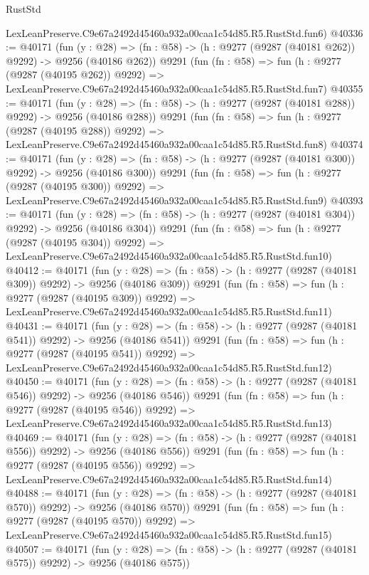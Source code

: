 \begin{lexlean}{RustStd}
\begin{coremodule}
    LexLeanPreserve.C9e67a2492d45460a932a00caa1c54d85.R5.RustStd.fun6)
@40336 := @40171
    (fun (y : @28) => (fn : @58) -> (h : @9277 (@9287 (@40181 @262)) @9292) -> @9256 (@40186 @262))
    @9291
    (fun (fn : @58) =>
    fun (h : @9277 (@9287 (@40195 @262)) @9292) =>
    LexLeanPreserve.C9e67a2492d45460a932a00caa1c54d85.R5.RustStd.fun7)
@40355 := @40171
    (fun (y : @28) => (fn : @58) -> (h : @9277 (@9287 (@40181 @288)) @9292) -> @9256 (@40186 @288))
    @9291
    (fun (fn : @58) =>
    fun (h : @9277 (@9287 (@40195 @288)) @9292) =>
    LexLeanPreserve.C9e67a2492d45460a932a00caa1c54d85.R5.RustStd.fun8)
@40374 := @40171
    (fun (y : @28) => (fn : @58) -> (h : @9277 (@9287 (@40181 @300)) @9292) -> @9256 (@40186 @300))
    @9291
    (fun (fn : @58) =>
    fun (h : @9277 (@9287 (@40195 @300)) @9292) =>
    LexLeanPreserve.C9e67a2492d45460a932a00caa1c54d85.R5.RustStd.fun9)
@40393 := @40171
    (fun (y : @28) => (fn : @58) -> (h : @9277 (@9287 (@40181 @304)) @9292) -> @9256 (@40186 @304))
    @9291
    (fun (fn : @58) =>
    fun (h : @9277 (@9287 (@40195 @304)) @9292) =>
    LexLeanPreserve.C9e67a2492d45460a932a00caa1c54d85.R5.RustStd.fun10)
@40412 := @40171
    (fun (y : @28) => (fn : @58) -> (h : @9277 (@9287 (@40181 @309)) @9292) -> @9256 (@40186 @309))
    @9291
    (fun (fn : @58) =>
    fun (h : @9277 (@9287 (@40195 @309)) @9292) =>
    LexLeanPreserve.C9e67a2492d45460a932a00caa1c54d85.R5.RustStd.fun11)
@40431 := @40171
    (fun (y : @28) => (fn : @58) -> (h : @9277 (@9287 (@40181 @541)) @9292) -> @9256 (@40186 @541))
    @9291
    (fun (fn : @58) =>
    fun (h : @9277 (@9287 (@40195 @541)) @9292) =>
    LexLeanPreserve.C9e67a2492d45460a932a00caa1c54d85.R5.RustStd.fun12)
@40450 := @40171
    (fun (y : @28) => (fn : @58) -> (h : @9277 (@9287 (@40181 @546)) @9292) -> @9256 (@40186 @546))
    @9291
    (fun (fn : @58) =>
    fun (h : @9277 (@9287 (@40195 @546)) @9292) =>
    LexLeanPreserve.C9e67a2492d45460a932a00caa1c54d85.R5.RustStd.fun13)
@40469 := @40171
    (fun (y : @28) => (fn : @58) -> (h : @9277 (@9287 (@40181 @556)) @9292) -> @9256 (@40186 @556))
    @9291
    (fun (fn : @58) =>
    fun (h : @9277 (@9287 (@40195 @556)) @9292) =>
    LexLeanPreserve.C9e67a2492d45460a932a00caa1c54d85.R5.RustStd.fun14)
@40488 := @40171
    (fun (y : @28) => (fn : @58) -> (h : @9277 (@9287 (@40181 @570)) @9292) -> @9256 (@40186 @570))
    @9291
    (fun (fn : @58) =>
    fun (h : @9277 (@9287 (@40195 @570)) @9292) =>
    LexLeanPreserve.C9e67a2492d45460a932a00caa1c54d85.R5.RustStd.fun15)
@40507 := @40171
    (fun (y : @28) => (fn : @58) -> (h : @9277 (@9287 (@40181 @575)) @9292) -> @9256 (@40186 @575))

\end{coremodule}
\end{lexlean}
